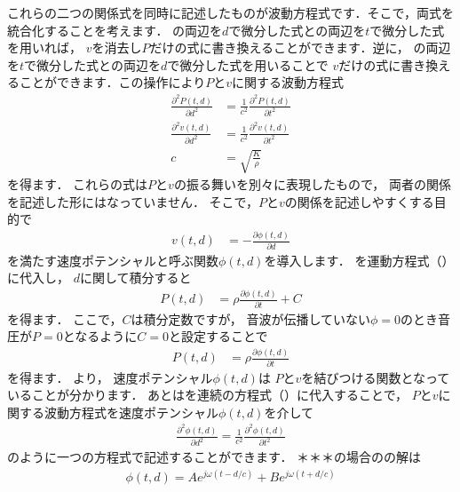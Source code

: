 これらの二つの関係式を同時に記述したものが波動方程式です．そこで，両式を統合化することを考えます．
の両辺を$d$で微分した式との両辺を$t$で微分した式を用いれば，
$v$を消去し$P$だけの式に書き換えることができます．逆に，
の両辺を$t$で微分した式との両辺を$d$で微分した式を用いることで
$v$だけの式に書き換えることができます．この操作により$P$と$v$に関する波動方程式
\begin{align}
\frac{\partial^2 P(t,d)}{\partial d^2} &= \frac{1}{c^2} \frac{\partial^2 P(t,d)}{\partial t^2}
\\
\frac{\partial^2 v(t,d)}{\partial d^2} &= \frac{1}{c^2} \frac{\partial^2 v(t,d)}{\partial t^2}
\\
c &=\sqrt{\textstyle\frac{K}{\rho}}
\end{align}
を得ます．
これらの式は$P$と$v$の振る舞いを別々に表現したもので，
両者の関係を記述した形にはなっていません．
そこで，$P$と$v$の関係を記述しやすくする目的で
\begin{align}
v(t,d) &=
- \frac{\partial \phi(t,d)}{\partial d}
\label{eq:def_velpot}
\end{align}
を満たす速度ポテンシャルと呼ぶ関数$\phi(t,d)$を導入します．
を運動方程式（）に代入し，
$d$に関して積分すると
\begin{align}
P(t,d) &=
\rho \frac{\partial \phi(t,d)}{\partial t} + C
\end{align}
を得ます．
ここで，$C$は積分定数ですが，
音波が伝播していない$\phi=0$のとき音圧が$P=0$となるように$C=0$と設定することで
\begin{align}
P(t,d) &=
\rho \frac{\partial \phi(t,d)}{\partial t}
\label{eq:def_velpot2}
\end{align}
を得ます．
より，
速度ポテンシャル$\phi(t,d)$は
$P$と$v$を結びつける関数となっていることが分かります．
あとはを連続の方程式（）に代入することで，
$P$と$v$に関する波動方程式を速度ポテンシャル$\phi(t,d)$を介して
\begin{align}
\frac{\partial^2 \phi(t,d)}{\partial d^2} = 
\frac{1}{c^2}\frac{\partial^2 \phi(t,d)}{\partial t^2} 
\label{eq:waveq}
\end{align}
のように一つの方程式で記述することができます．
＊＊＊の場合のの解は
\begin{align}
\phi(t,d) = A e^{j\omega(t-d/c)} + B e^{j\omega(t+d/c)}
\end{align}

